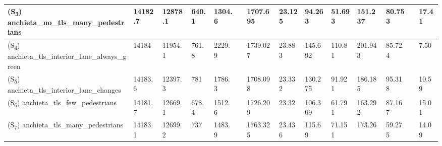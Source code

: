 \begin{table}
{\begin{tabular}{llllllllllllll}
    (S\textsubscript{3}) anchieta\_no\_tls\_many\_pedestrians                    & 14182.7                      & 12878.1                        & 640.1                            & 1304.6                          &  & 1707.695                         & 23.125                              & 94.263                              & 51.693                           & 151.237                          & 80.753                          &  & 17.41                             \\ \hline
    (S\textsubscript{4}) anchieta\_tls\_interior\_lane\_always\_green            & 14184                        & 11954.1                        & 761.8                            & 2229.9                          &  & 1739.027                         & 23.883                              & 145.692                             & 110.81                           & 201.943                          & 85.724                          &  & 7.50                              \\ \hline
    (S\textsubscript{5}) anchieta\_tls\_interior\_lane\_changes                  & 14183.6                      & 12397.3                        & 781                              & 1786.3                          &  & 1708.098                         & 23.332                              & 130.275                             & 91.921                           & 186.185                          & 95.318                          &  & 10.59                             \\ \hline
    (S\textsubscript{6}) anchieta\_tls\_few\_pedestrians                        & 14181.7                      & 12669.1                        & 678.4                            & 1512.6                          &  & 1726.209                         & 23.32                               & 106.309                              & 61.791                           & 163.292                          & 87.167                          &  & 15.01                             \\ \hline
    (S\textsubscript{7}) anchieta\_tls\_many\_pedestrians                       & 14183.1                      & 12699.2                        & 737                              & 1483.9                          &  & 1763.325                         & 23.436                              & 115.69                               & 71.151                           & 173.26                           & 59.275                          &  & 14.09                             \\ \hline
    \end{tabular}}
\end{table}


